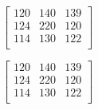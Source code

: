 \documentclass{scrbook}
\begin{document}
$
\begin{bmatrix}
    120 & 140 & 139\\[-1ex]
    124 & 220 & 120\\[-1ex]
    114 & 130 & 122\\
\end{bmatrix}
$

$
\begin{bmatrix}
    120 & 140 & 139\\
    124 & 220 & 120\\
    114 & 130 & 122\\
\end{bmatrix}
$
\end{document}
